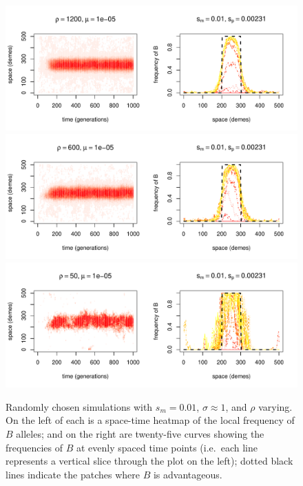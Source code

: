\documentclass{article}
\begin{document}
\begin{figure}
  \begin{center}
    \includegraphics{example-mutation-sims/43099-r1-501-sb0_01-sm-0_01-N1200-pophistory-run}
    \includegraphics{example-mutation-sims/69787-r1-501-sb0_01-sm-0_01-N600-pophistory-run}
    \includegraphics{example-mutation-sims/11821-r1-501-sb0_01-sm-0_01-N50-pophistory-run}
  \end{center}
  \caption{
    Randomly chosen simulations with $s_m=0.01$, $\sigma\approx 1$, and $\rho$ varying.
    On the left of each is a space-time heatmap of the local frequency of $B$ alleles;
    and on the right are twenty-five curves showing the frequencies of $B$ at evenly spaced time points
    (i.e.\ each line represents a vertical slice through the plot on the left);
    dotted black lines indicate the patches where $B$ is advantageous.
  } \label{sfig:sims_2}
\end{figure}
\end{document}
